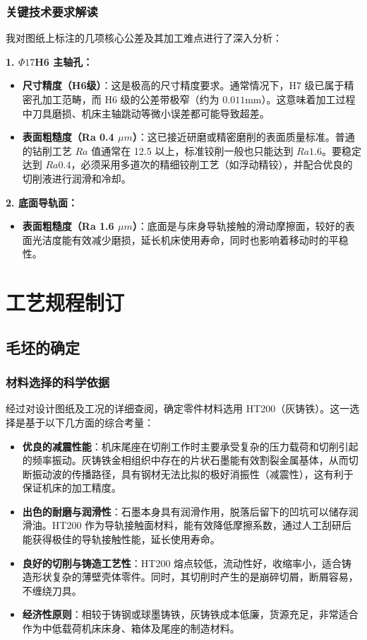 \documentclass[withoutpreface,bwprint]{cumcmthesis}
\begin{document}
\subsubsection{关键技术要求解读}
我对图纸上标注的几项核心公差及其加工难点进行了深入分析：

\textbf{1. $\Phi17$H6 主轴孔：}
\begin{itemize}
    \item \textbf{尺寸精度（H6级）}：这是极高的尺寸精度要求。通常情况下，H7 级已属于精密孔加工范畴，而 H6 级的公差带极窄（约为 $0.011$mm）。这意味着加工过程中刀具磨损、机床主轴跳动等微小误差都可能导致超差。
    \item \textbf{表面粗糙度（Ra 0.4 $\mu m$）}：这已接近研磨或精密磨削的表面质量标准。普通的钻削工艺 $Ra$ 值通常在 12.5 以上，标准铰削一般也只能达到 $Ra 1.6$。要稳定达到 $Ra 0.4$，必须采用多道次的精细铰削工艺（如浮动精铰），并配合优良的切削液进行润滑和冷却。
\end{itemize}

\textbf{2. 底面导轨面：}
\begin{itemize}
    \item \textbf{表面粗糙度（Ra 1.6 $\mu m$）}：底面是与床身导轨接触的滑动摩擦面，较好的表面光洁度能有效减少磨损，延长机床使用寿命，同时也影响着移动时的平稳性。
\end{itemize}



\section{工艺规程制订}

\subsection{毛坯的确定}
\subsubsection{材料选择的科学依据}
经过对设计图纸及工况的详细查阅，确定零件材料选用 HT200（灰铸铁）。这一选择是基于以下几方面的综合考量：
\begin{itemize}
    \item \textbf{优良的减震性能}：机床尾座在切削工作时主要承受复杂的压力载荷和切削引起的频率振动。灰铸铁金相组织中存在的片状石墨能有效割裂金属基体，从而切断振动波的传播路径，具有钢材无法比拟的极好消振性（减震性），这有利于保证机床的加工精度。
    \item \textbf{出色的耐磨与润滑性}：石墨本身具有润滑作用，脱落后留下的凹坑可以储存润滑油。HT200 作为导轨接触面材料，能有效降低摩擦系数，通过人工刮研后能获得极佳的导轨接触性能，延长使用寿命。
    \item \textbf{良好的切削与铸造工艺性}：HT200 熔点较低，流动性好，收缩率小，适合铸造形状复杂的薄壁壳体零件。同时，其切削时产生的是崩碎切屑，断屑容易，不缠绕刀具。
    \item \textbf{经济性原则}：相较于铸钢或球墨铸铁，灰铸铁成本低廉，货源充足，非常适合作为中低载荷机床床身、箱体及尾座的制造材料。
\end{itemize}
\end{document}
